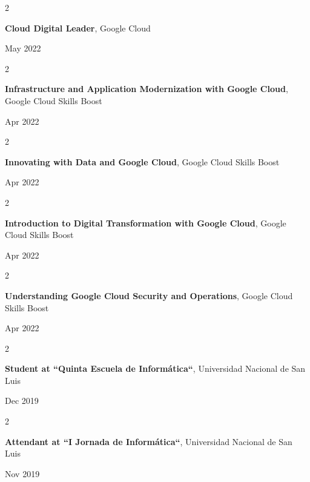\documentclass[10pt, letterpaper]{article}
\newenvironment{twocolentry}[2][]{
    \onecolentry
    \def\secondColumn{#2}
    \setcolumnwidth{\fill, 4.5 cm}
    \begin{paracol}{2}
}{
    \switchcolumn \raggedleft \secondColumn
    \end{paracol}
    \endonecolentry
} %
\begin{document}
    \begin{twocolentry}{
            May 2022
        }
        \textbf{Cloud Digital Leader}, Google Cloud
    \end{twocolentry}
    \begin{twocolentry}{
            Apr 2022
        }
        \textbf{Infrastructure and Application Modernization with Google Cloud}, Google Cloud Skills Boost
    \end{twocolentry}
    \begin{twocolentry}{
            Apr 2022
        }
        \textbf{Innovating with Data and Google Cloud}, Google Cloud Skills Boost
    \end{twocolentry}
    \begin{twocolentry}{
            Apr 2022
        }
        \textbf{Introduction to Digital Transformation with Google Cloud}, Google Cloud Skills Boost
    \end{twocolentry}
    \begin{twocolentry}{
            Apr 2022
        }
        \textbf{Understanding Google Cloud Security and Operations}, Google Cloud Skills Boost
    \end{twocolentry}
    \begin{twocolentry}{
            Dec 2019
        }
        \textbf{Student at “Quinta Escuela de Informática“}, Universidad Nacional de San Luis
    \end{twocolentry}
    \begin{twocolentry}{
            Nov 2019
        }
        \textbf{Attendant at “I Jornada de Informática“}, Universidad Nacional de San Luis
    \end{twocolentry}
\end{document}
